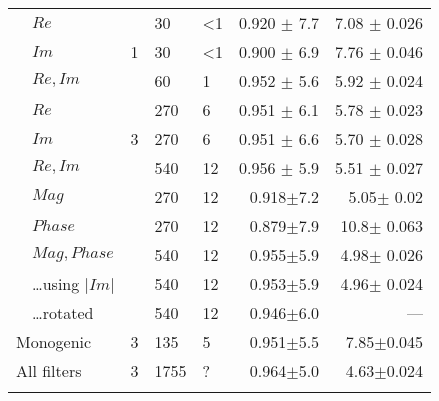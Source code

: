\begin{tabularx}{\linewidth}{p{3cm} X X X X r r}
\midrule
\multirow{11}{3cm}{\dtcwt{}}
        & $Re$                  & \multirow{3}{1cm}{ 1 }
                                    &      30   &{<}1  & 0.920 $\pm$ 7.7   &  7.08 $\pm$ 0.026  \\
        & $Im$                      &&     30   &{<}1  & 0.900 $\pm$ 6.9   &  7.76 $\pm$ 0.046 \\
        & $Re,Im$                   &&     60   &  1    & 0.952 $\pm$ 5.6   &  5.92 $\pm$ 0.024 \\
        & $Re$                  & \multirow{3}{1cm}{ 3 }
                                    &     270   &  6    & 0.951 $\pm$ 6.1   & 5.78 $\pm$ 0.023 \\
        & $Im$                      &&    270   &  6    & 0.951 $\pm$ 6.6   & 5.70 $\pm$ 0.028 \\
        & $Re,Im$                   &&    540   & 12  & 0.956 $\pm$ 5.9   & 5.51 $\pm$ 0.027 \\

        & $Mag$                     &&   270    & 12   & 0.918$\pm$7.2     & 5.05$\pm$ 0.02 \\
        & $Phase$                   &&   270    & 12   & 0.879$\pm$7.9     & 10.8$\pm$ 0.063 \\
        & $Mag,Phase$               &&   540    & 12   & 0.955$\pm$5.9     & 4.98$\pm$ 0.026 \\
        & \ldots using $|Im|$       &&   540    & 12   & 0.953$\pm$5.9     & 4.96$\pm$ 0.024 \\
        & \ldots rotated            &&   540    & 12    & 0.946$\pm$6.0     & --- \\
\midrule
\multicolumn{2}{l}{Monogenic}       & \multirow{1}{1cm}{ 3 }
                                    &    135    &  5      & 0.951$\pm$5.5     & 7.85$\pm$0.045 \\
\midrule
\multicolumn{2}{l}{All filters}     & \multirow{1}{1cm}{ 3 }
                                    &   1755    &?       & 0.964$\pm$5.0     & 4.63$\pm$0.024 \\

\bottomrule
\noalign{\smallskip}
\end{tabularx}
